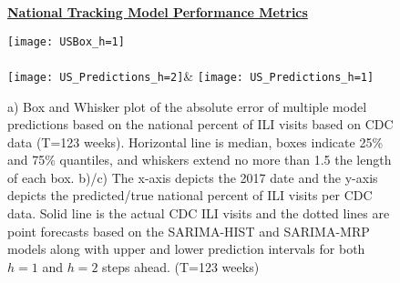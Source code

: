\documentclass[fleqn,10pt]{wlscirep}
\begin{document}
 \begin{figure}%
 \centering
 \textbf{\underline{National Tracking Model Performance Metrics}}\par\medskip
    \texttt{[image: USBox\_h=1]}\\
        \\
 \texttt{[image: US\_Predictions\_h=2]}&
  \texttt{[image: US\_Predictions\_h=1]}\\
  \subfloat[\label{2step} $h=2$ step predictions.]{\hspace{.3\linewidth}}
\subfloat[\label{1step} $h=1$ step predictions.]{\hspace{.3\linewidth}}
 \caption{a) Box and Whisker plot of the absolute error of multiple model predictions based on the national percent of ILI visits based on CDC data (T=123 weeks). Horizontal line is median, boxes indicate 25\% and 75\% quantiles, and whiskers extend no more than 1.5 the length of each box. b)/c) The x-axis depicts the 2017 date and the y-axis depicts the predicted/true national percent of ILI visits per CDC data. Solid line is the actual CDC ILI visits and the dotted lines are point forecasts based on the SARIMA-HIST and SARIMA-MRP models along with upper and lower prediction intervals for both $h=1$ and $h=2$ steps ahead. (T=123 weeks)}
  \label{fig:US_Box}
 \end{figure}
 
\end{document}
